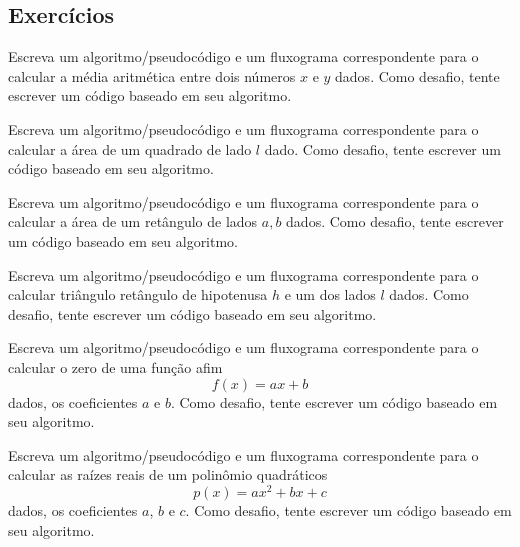 \subsection{Exercícios}

\begin{exer}
  Escreva um algoritmo/pseudocódigo e um fluxograma correspondente para o calcular a média aritmética entre dois números $x$ e $y$ dados. Como desafio, tente escrever um código {\python} baseado em seu algoritmo.
\end{exer}

\begin{exer}
  Escreva um algoritmo/pseudocódigo e um fluxograma correspondente para o calcular a área de um quadrado de lado $l$ dado. Como desafio, tente escrever um código {\python} baseado em seu algoritmo.
\end{exer}

\begin{exer}
  Escreva um algoritmo/pseudocódigo e um fluxograma correspondente para o calcular a área de um retângulo de lados $a, b$ dados. Como desafio, tente escrever um código {\python} baseado em seu algoritmo.
\end{exer}

\begin{exer}
  Escreva um algoritmo/pseudocódigo e um fluxograma correspondente para o calcular triângulo retângulo de hipotenusa $h$ e um dos lados $l$ dados. Como desafio, tente escrever um código {\python} baseado em seu algoritmo.
\end{exer}

\begin{exer}
  Escreva um algoritmo/pseudocódigo e um fluxograma correspondente para o calcular o zero de uma função afim
  \begin{equation}
    f(x) = ax + b
  \end{equation}
  dados, os coeficientes $a$ e $b$. Como desafio, tente escrever um código {\python} baseado em seu algoritmo.
\end{exer}

\begin{exer}
  Escreva um algoritmo/pseudocódigo e um fluxograma correspondente para o calcular as raízes reais de um polinômio quadráticos
  \begin{equation}
    p(x) = ax^2 + bx + c
  \end{equation}
  dados, os coeficientes $a$, $b$ e $c$. Como desafio, tente escrever um código {\python} baseado em seu algoritmo.
\end{exer}

